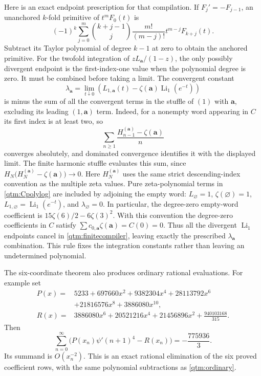 Here is an exact endpoint prescription for that compilation.  If
$F_j'=-F_{j-1}$, an unanchored $k$-fold primitive of $t^mF_0(t)$ is
\begin{equation}\label{qtm:primitivecompiler}
 (-1)^k\sum_{j=0}^m\binom{k+j-1}{j}
      \frac{m!}{(m-j)!}t^{m-j}F_{k+j}(t).
\end{equation}
Subtract its Taylor polynomial of degree $k-1$ at zero to obtain
the anchored primitive.  For the twofold integration of
$zL_{\boldsymbol a}/(1-z)$, the only possibly divergent endpoint
is the first-index-one value when the polynomial degree is zero.
It must be combined before taking a limit.  The convergent constant
\[
 \lambda_{\boldsymbol a}
  =\lim_{t\downarrow0}
   \left(L_{1,\boldsymbol a}(t)
             -\zeta(\boldsymbol a)\operatorname{Li}_1(e^{-t})\right)
\]
is minus the sum of all the convergent terms in the stuffle of
$(1)$ with $\boldsymbol a$, excluding its leading $(1,\boldsymbol a)$
term.  Indeed, for a nonempty word appearing in $C$ its first index
is at least two, so
\[
 \sum_{n\ge1}\frac{H_{n-1}^{(\boldsymbol a)}
                         -\zeta(\boldsymbol a)}{n}
\]
converges absolutely, and dominated convergence identifies it with
the displayed limit.  The finite harmonic stuffle evaluates this
sum, since
$H_N\bigl(H_N^{(\boldsymbol a)}-\zeta(\boldsymbol a)\bigr)\to0$.
Here $H_N^{(\boldsymbol a)}$ uses the same strict descending-index
convention as the multiple zeta values.  Pure zeta-polynomial terms in
\eqref{qtm:Cpolylog} are included by adjoining the empty word:
$L_{\varnothing}=1$, $\zeta(\varnothing)=1$,
$L_{1,\varnothing}=\operatorname{Li}_1(e^{-t})$, and
$\lambda_{\varnothing}=0$.
In particular, the degree-zero empty-word coefficient is
$15\zeta(6)/2-6\zeta(3)^2$.
With this convention the degree-zero coefficients in $C$ satisfy
$\sum c_{0,\boldsymbol a}\zeta(\boldsymbol a)=C(0)=0$.
Thus all the divergent $\operatorname{Li}_1$ endpoints cancel in
\eqref{qtm:finitecompiler}, leaving exactly the prescribed
$\lambda_{\boldsymbol a}$ combination.  This rule fixes the integration
constants rather than leaving an undetermined polynomial.

The six-coordinate theorem also produces ordinary rational evaluations.
For example set
\begin{align*}
 P(x)={}&5233+697660x^2+9382304x^4+28113792x^6\\
        &+21816576x^8+3886080x^{10},\\
 R(x)={}&3886080x^6+20521216x^4+21456896x^2
                         +\frac{940103168}{315}.
\end{align*}
Then
\begin{equation}\label{qtm:rational}
 \boxed{\displaystyle
 \sum_{n=0}^{\infty}\bigl(P(x_n)\psi'(n+1)^4-R(x_n)\bigr)
       =-\frac{775936}{3}.}
\end{equation}
Its summand is $O(x_n^{-2})$.  This is an exact rational elimination
of the six proved coefficient rows, with the same polynomial
subtractions as \eqref{qtm:ordinary}.

